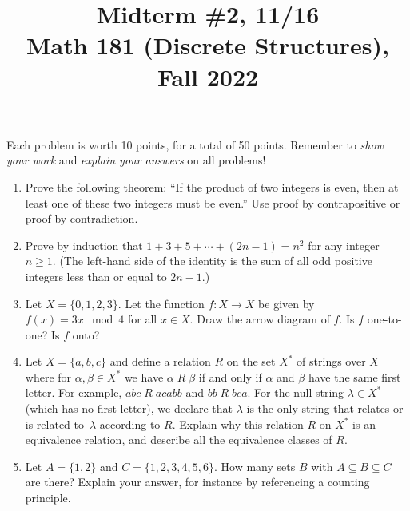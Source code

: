 \documentclass[11pt]{article}
\title{Midterm \#2, 11/16 \\Math 181 (Discrete Structures), Fall 2022}
\date{}
\begin{document}
\maketitle

\thispagestyle{empty}

\vspace{-1cm}

Each problem is worth 10 points, for a total of 50 points. Remember to \emph{show your work} and \emph{explain your answers} on all problems!

\begin{enumerate}

\item Prove the following theorem: ``If the product of two integers is even, then at least one of these two integers must be even.'' Use proof by contrapositive or proof by contradiction.

\item Prove by induction that $1+3+5 + \cdots + (2n-1) = n^2$ for any integer $n\geq 1$. (The left-hand side of the identity is the sum of all odd positive integers less than or equal to $2n-1$.)

\item Let $X = \{0,1,2,3\}$. Let the function $f\colon X \to X$ be given by $f(x) = 3x \mod 4$ for all $x \in X$. Draw the arrow diagram of $f$. Is $f$ one-to-one? Is $f$ onto?

\item Let $X = \{a,b,c\}$ and define a relation $R$ on the set $X^*$ of strings over $X$ where for $\alpha, \beta \in X^*$ we have $\alpha \; R \; \beta$ if and only if $\alpha$ and $\beta$ have the same first letter. For example, $abc \; R \; acabb$ and $bb \; R \; bca$. For the null string $\lambda \in X^*$ (which has no first letter), we declare that $\lambda$ is the only string that relates or is related to~$\lambda$ according to $R$. Explain why this relation $R$ on $X^*$ is an equivalence relation, and describe all the equivalence classes of $R$.

\item Let $A = \{1,2\}$ and $C = \{1,2,3,4,5,6\}$. How many sets $B$ with $A \subseteq B \subseteq C$ are there? Explain your answer, for instance by referencing a counting principle.


\end{enumerate}
\end{document}
